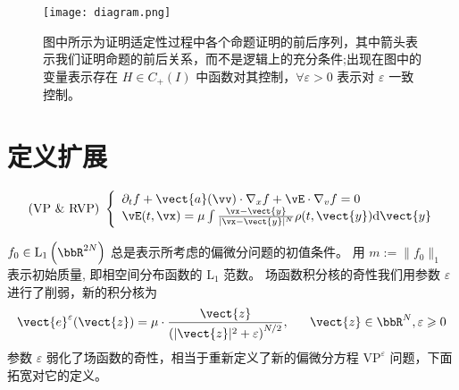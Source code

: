 

\begin{figure}[h]
    \centering
    \texttt{[image: diagram.png]}
    \caption{图中所示为证明适定性过程中各个命题证明的前后序列，其中箭头表示我们证明命题的前后关系，而不是逻辑上的充分条件;出现在图中的变量表示存在 $H\in C_+(I)$ 中函数对其控制，$\forall \varepsilon>0$ 表示对 $\varepsilon$ 一致控制。}
    \label{fig:diagram}
\end{figure}


\section{定义扩展}
\begin{equation}
    \label{eq:vp_ndim}
    \text { (VP \& RVP) }\left\{\begin{array}{l}
    \partial_{t} f+\vect{a}(\vv ) \cdot \nabla_{x} f+\vE \cdot \nabla_{v} f=0 \\
    \vE(t, \vx)=\mu\int \frac{\vx - \vect{y}}{|\vx - \vect{y}|^N} \rho(t,\vect{y}) \mathrm{d} \vect{y} %
\end{array}\right.\end{equation}


 $f_{0} \in \mathrm{L}_{1}\left(\bbR^{2 N}\right)$ 总是表示所考虑的偏微分问题的初值条件。 用 $m:=\|f_{0}\|_{1}$ 表示初始质量, 即相空间分布函数的 $\mathrm{L}_1$ 范数。
场函数积分核的奇性我们用参数 $\varepsilon$ 进行了削弱，新的积分核为
$$\vect{e}^{\varepsilon}(\vect{z})=\mu \cdot \frac{\vect{z}}{\left(|\vect{z}|^{2}+\varepsilon\right)^{N / 2}},~ \quad ~ \vect{z} \in \bbR^{N}, \varepsilon \geqslant 0$$
参数 $\varepsilon$ 弱化了场函数的奇性，相当于重新定义了新的偏微分方程 $\text{VP}^\varepsilon$ 问题，下面拓宽对它的定义。

